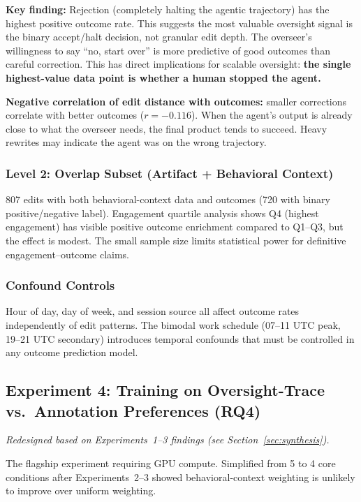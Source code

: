 \documentclass[11pt]{article}
\begin{document}
\textbf{Key finding:} Rejection (completely halting the agentic trajectory) has the highest positive outcome rate.
This suggests the most valuable oversight signal is the binary accept/halt decision, not granular edit depth.
The overseer's willingness to say ``no, start over'' is more predictive of good outcomes than careful correction.
This has direct implications for scalable oversight: \textbf{the single highest-value data point is whether a human stopped the agent.}

\textbf{Negative correlation of edit distance with outcomes:} smaller corrections correlate with better outcomes ($r = -0.116$).
When the agent's output is already close to what the overseer needs, the final product tends to succeed.
Heavy rewrites may indicate the agent was on the wrong trajectory.

\subsubsection{Level 2: Overlap Subset (Artifact + Behavioral Context)}

807 edits with both behavioral-context data and outcomes (720 with binary positive/negative label).
Engagement quartile analysis shows Q4 (highest engagement) has visible positive outcome enrichment compared to Q1--Q3, but the effect is modest.
The small sample size limits statistical power for definitive engagement--outcome claims.

\subsubsection{Confound Controls}

Hour of day, day of week, and session source all affect outcome rates independently of edit patterns.
The bimodal work schedule (07--11 UTC peak, 19--21 UTC secondary) introduces temporal confounds that must be controlled in any outcome prediction model.

\subsection{Experiment 4: Training on Oversight-Trace vs.\ Annotation Preferences (RQ4)}
\label{sec:exp4}

\emph{Redesigned based on Experiments~1--3 findings (see Section~\ref{sec:synthesis}).}

The flagship experiment requiring GPU compute.
Simplified from 5 to 4 core conditions after Experiments~2--3 showed behavioral-context weighting is unlikely to improve over uniform weighting.
\end{document}
